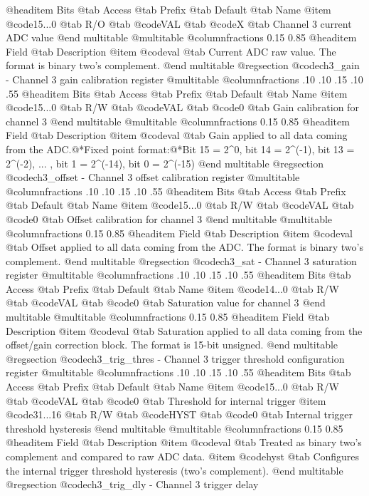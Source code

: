 @headitem Bits @tab Access @tab Prefix @tab Default @tab Name
@item @code{15...0}
@tab R/O @tab
@code{VAL}
@tab @code{X} @tab 
Channel 3 current ADC value
@end multitable
@multitable @columnfractions 0.15 0.85
@headitem Field @tab Description
@item @code{val} @tab Current ADC raw value. The format is binary two's complement.
@end multitable
@regsection @code{ch3_gain} - Channel 3 gain calibration register
@multitable @columnfractions .10 .10 .15 .10 .55
@headitem Bits @tab Access @tab Prefix @tab Default @tab Name
@item @code{15...0}
@tab R/W @tab
@code{VAL}
@tab @code{0} @tab 
Gain calibration for channel 3
@end multitable
@multitable @columnfractions 0.15 0.85
@headitem Field @tab Description
@item @code{val} @tab Gain applied to all data coming from the ADC.@*Fixed point format:@*Bit 15 = 2^0, bit 14 = 2^(-1), bit 13 = 2^(-2), ... , bit 1 = 2^(-14), bit 0 = 2^(-15)
@end multitable
@regsection @code{ch3_offset} - Channel 3 offset calibration register
@multitable @columnfractions .10 .10 .15 .10 .55
@headitem Bits @tab Access @tab Prefix @tab Default @tab Name
@item @code{15...0}
@tab R/W @tab
@code{VAL}
@tab @code{0} @tab 
Offset calibration for channel 3
@end multitable
@multitable @columnfractions 0.15 0.85
@headitem Field @tab Description
@item @code{val} @tab Offset applied to all data coming from the ADC. The format is binary two's complement.
@end multitable
@regsection @code{ch3_sat} - Channel 3 saturation register
@multitable @columnfractions .10 .10 .15 .10 .55
@headitem Bits @tab Access @tab Prefix @tab Default @tab Name
@item @code{14...0}
@tab R/W @tab
@code{VAL}
@tab @code{0} @tab 
Saturation value for channel 3
@end multitable
@multitable @columnfractions 0.15 0.85
@headitem Field @tab Description
@item @code{val} @tab Saturation applied to all data coming from the offset/gain correction block. The format is 15-bit unsigned.
@end multitable
@regsection @code{ch3_trig_thres} - Channel 3 trigger threshold configuration register
@multitable @columnfractions .10 .10 .15 .10 .55
@headitem Bits @tab Access @tab Prefix @tab Default @tab Name
@item @code{15...0}
@tab R/W @tab
@code{VAL}
@tab @code{0} @tab 
Threshold for internal trigger
@item @code{31...16}
@tab R/W @tab
@code{HYST}
@tab @code{0} @tab 
Internal trigger threshold hysteresis
@end multitable
@multitable @columnfractions 0.15 0.85
@headitem Field @tab Description
@item @code{val} @tab Treated as binary two's complement and compared to raw ADC data.
@item @code{hyst} @tab Configures the internal trigger threshold hysteresis (two's complement).
@end multitable
@regsection @code{ch3_trig_dly} - Channel 3 trigger delay
